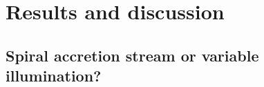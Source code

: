 \documentclass[longauth]{aa}
\begin{document}
    
    
\section{Results and discussion}\label{sec:results}

\subsection{Spiral accretion stream or variable illumination?}\label{sec:spiral}
\end{document}
